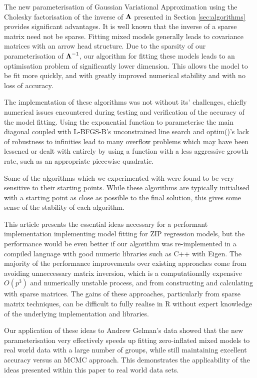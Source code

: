 \documentclass{article}[12pt]
\begin{document}
	The new parameterisation of Gaussian Variational Approximation using the Cholesky factorisation of the inverse
	of ${\boldsymbol \Lambda}$ presented in Section \ref{sec:algorithms} provides significant advantages.  It is well known
	that the inverse of a sparse matrix need not be sparse. Fitting mixed models generally leads to covariance
	matrices with an arrow head structure. Due to the sparsity of our parameterisation of ${\boldsymbol \Lambda}^{-1}$,  our
	algorithm for fitting these models leads to an optimisation problem of significantly lower dimension. This
	allows the model to be fit more quickly, and with greatly improved numerical stability and with no loss of
	accuracy.
	
	The implementation of these algorithms was not without its' challenges, chiefly numerical issues encountered
	during testing and verification of the accuracy of the model fitting. Using the exponential function to
	parameterise the main diagonal coupled with L-BFGS-B's unconstrained line search and optim()'s lack of
	robustness to infinities lead to many overflow problems which may have been lessened or dealt with entirely by
	using a function with a less aggressive growth rate, such as an appropriate piecewise quadratic.
	
	Some of the algorithms which we experimented with were found to be very sensitive to their starting points.
	While these algorithms are typically initialised with a starting point as close as possible to the final
	solution, this gives some sense of the stability of each algorithm.
	
	This article presents the essential ideas necessary for a performant implementation implementing model fitting
	for ZIP regression models, but the performance would be even better if our algorithm was re-implemented in a
	compiled language with good numeric libraries such as C++ with Eigen. The majority of the performance
	improvements over existing approaches come from avoiding unneccessary matrix inversion, which is a
	computationally expensive $O(p^3)$ and numerically unstable process, and from constructing and calculating
	with sparse matrices. The gains of these approaches, particularly from sparse matrix techniques, can be
	difficult to fully realise in R without expert knowledge of the underlying implementation and libraries.
	
	Our application of these ideas to Andrew Gelman's data showed that the new parameterisation very effectively
	speeds up fitting zero-inflated mixed models to real world data with a large number of groups, while still
	maintaining excellent accuracy versus an MCMC approach. This demonstrates the applicability of the ideas
	presented within this paper to real world data sets.
	
\end{document}
